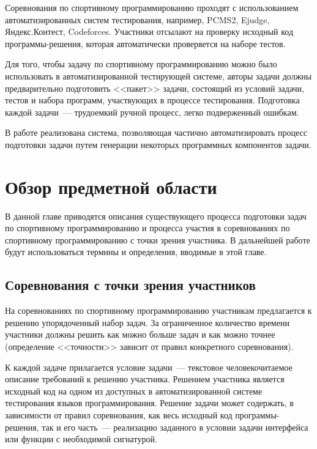 \documentclass[times,specification,annotation]{style/itmo-student-thesis/itmo-student-thesis}
\begin{document}
\tableofcontents

\startprefacepage

Соревнования по спортивному программированию проходят с использованием автоматизированных систем тестирования, например, PCMS2, Ejudge, Яндекс.Контест, Codeforces. Участники отсылают на проверку исходный код программы-решения, которая автоматически проверяется на наборе тестов. 

Для того, чтобы задачу по спортивному программированию можно было использовать в автоматизированной тестирующей системе, авторы задачи должны предварительно подготовить <<пакет>> задачи, состоящий из условий задачи, тестов и набора программ, участвующих в процессе тестирования. Подготовка каждой задачи~--- трудоемкий ручной процесс, легко подверженный ошибкам.

В работе реализована система, позволяющая частично автоматизировать процесс подготовки задачи путем генерации некоторых  программных компонентов задачи.


\chapter{Обзор предметной области}


В данной главе приводятся описания существующего процесса подготовки задач по спортивному программированию и процесса участия в соревнованиях по спортивному программированию с точки зрения участника. В дальнейшей работе будут использоваться термины и определения, вводимые в этой главе.

\section{Соревнования с точки зрения участников}

На соревнованиях по спортивному программированию участникам предлагается к решению упорядоченный набор задач. За ограниченное количество времени участники должны решить как можно больше задач и как можно точнее (определение <<точности>> зависит от правил конкретного соревнования).

К каждой задаче прилагается условие задачи~--- текстовое человекочитаемое описание требований к решению участника. Решением участника является исходный код на одном из доступных в автоматизированной системе тестирования языков программирования. Решение задачи может содержать, в зависимости от правил соревнования, как весь исходный код программы-решения, так и его часть~--- реализацию заданного в условии задачи интерфейса или функции с необходимой сигнатурой.
\end{document}
